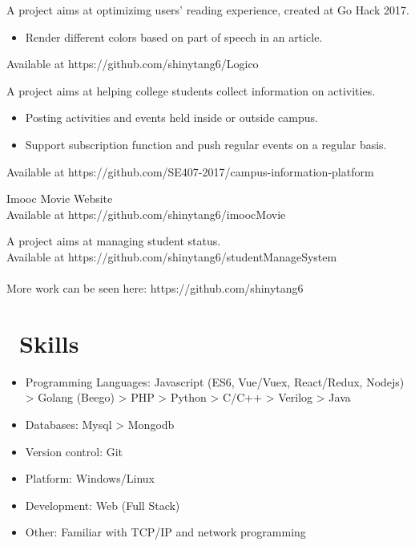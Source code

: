 \documentclass{resume}
\begin{document}
A project aims at optimizimg users' reading experience, created at Go Hack 2017.
\begin{itemize}
  \item Render different colors based on part of speech in an article.
\end{itemize}
Available at https://github.com/shinytang6/Logico


A project aims at helping college students collect information on activities.\begin{itemize}
  \item Posting activities and events held inside or outside campus.
  \item Support subscription function and push regular events on a regular basis.
\end{itemize}
Available at https://github.com/SE407-2017/campus-information-platform



Imooc Movie Website\\
Available at https://github.com/shinytang6/imoocMovie


A project aims at managing student status.\\
Available at https://github.com/shinytang6/studentManageSystem
\\
\\
More work can be seen here: https://github.com/shinytang6


\section{\faCogs\ Skills}
\begin{itemize}[parsep=0.5ex]
  \item Programming Languages: Javascript (ES6, Vue/Vuex, React/Redux, Nodejs) > Golang (Beego) > PHP > Python > C/C++ > Verilog > Java
  \item Databases: Mysql > Mongodb
  \item Version control: Git
  \item Platform: Windows/Linux
  \item Development: Web (Full Stack)
  \item Other: Familiar with TCP/IP and network programming
\end{itemize}
\end{document}
